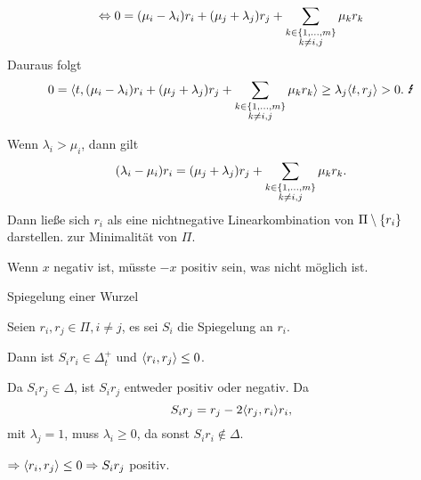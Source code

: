 \documentclass[18pt]{beamer}
\begin{document}
\begin{frame}
    \begin{bew}
        \[ \Leftrightarrow 0 = (\mu_i - \lambda_i)
        r_i + (\mu_j + \lambda_j) 
        r_j + 
        \sum_{
            \substack{k \in \{1,\ldots, m\}\\k \neq i,j}}
        \mu_k r_k \]
        Dauraus folgt 
        \[ 0 = \scalarprod{t}{ 
            (\mu_i - \lambda_i) r_i + (\mu_j + \lambda_j) r_j 
        + \sum_{\substack{k \in \set{1,\ldots, m}\\k \neq i,j}}
        \mu_k r_k
        } \geq \lambda_j \scalarprod{t}{r_j} > 0. 
        \text{ \Lightning} \]

        \renewcommand{\qedsymbol}{}
    \end{bew}
\end{frame}

\begin{frame}
    \begin{bew}
        Wenn \( \lambda_i > \mu_i \), dann gilt 
        \[ (\lambda_i - \mu_i) r_i
        = (\mu_j + \lambda_j) r_j 
        + \sum_{\substack{k \in \{1,\ldots, m\}\\k \neq i,j}}
        \mu_k r_k. \]
        Dann ließe sich \( r_i \) als eine 
        nichtnegative Linearkombination von 
        \( \Pi \setminus \{r_i\} \) darstellen. 
        \Lightning{} zur Minimalität von 
        \( \Pi \).

        Wenn \( x \) negativ ist, müsste \( -x \) 
        positiv sein, was nicht möglich ist.
    \end{bew}
\end{frame}

\begin{frame}{Spiegelung einer Wurzel}
    \begin{satz} %
        Seien \( r_i, r_j \in \Pi, i \neq j \), es 
        sei \( S_i \) die Spiegelung an \( r_i \). 

        Dann ist \( S_i r_i \in \Delta_t^+ \) und 
        \( \langle r_i, r_j \rangle \leq 0 \).
    \end{satz}

    \begin{bew}
        Da \( S_i r_j \in \Delta \), ist \( S_i r_j \) 
        entweder positiv oder negativ. Da 
        \[ S_i r_j = r_j - 2 \langle r_j, r_i \rangle r_i, \]
        mit \( \lambda_j = 1 \), muss 
        \( \lambda_i \geq 0 \), da sonst 
        \( S_i r_i \notin \Delta \). 

        \( \Rightarrow \langle r_i, r_j \rangle \leq 0 
        \Rightarrow S_i r_j \) 
        positiv.
    \end{bew}
\end{frame}
\end{document}
